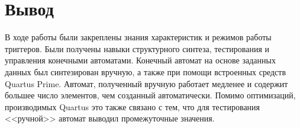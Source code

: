 \documentclass[a4paper,12pt]{article}
\begin{document}
    \section{Вывод}
    В ходе работы были закреплены знания характеристик и режимов работы триггеров. Были получены навыки
    структурного синтеза, тестирования и управления конечными автоматами. Конечный автомат на основе заданных
    данных был синтезирован вручную, а также при помощи встроенных средств Quartus Prime. Автомат, полученный
    вручную работает медленее и содержит большее число элементов, чем созданный автоматически. Помимо оптимизаций,
    производимых Quartus это также связано с тем, что для тестирования <<ручной>> автомат выводил промежуточные значения.
\end{document}
